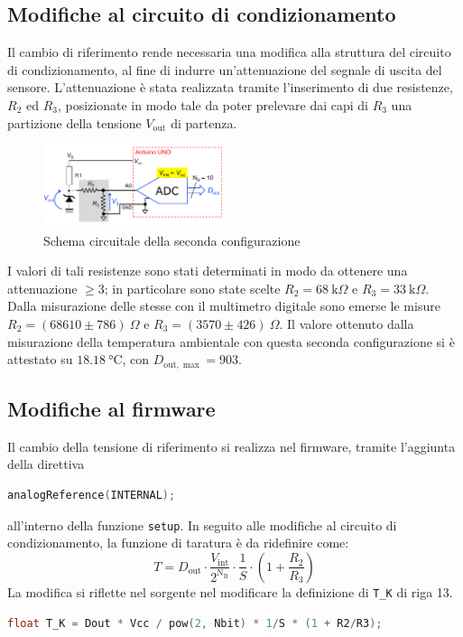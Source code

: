 \documentclass{article}
\begin{document}
\subsection{Modifiche al circuito di condizionamento}
Il cambio di riferimento rende necessaria una modifica alla struttura del circuito di condizionamento, al fine di indurre un'attenuazione del segnale di uscita del sensore. L'attenuazione è stata realizzata tramite l'inserimento di due resistenze, 
$R_2$ ed $R_3$, posizionate in modo tale da poter prelevare dai capi di $R_3$ una partizione della tensione $V_\text{out}$ di partenza.
\begin{figure}[H]
    \centering\includegraphics[width=200px]{img/circuito_2.png}
    \caption{Schema circuitale della seconda configurazione}
\end{figure}
I valori di tali resistenze sono stati determinati in modo da ottenere una attenuazione $\ge 3$; in particolare sono state scelte 
$R_2 = \SI{68}{\kilo\Omega}$ e $R_3=\SI{33}{\kilo\Omega}$. Dalla misurazione delle stesse con il multimetro digitale sono emerse le misure $R_2=\left(68610\pm786\right)\SI{}{\Omega}$ e $R_3=\left(3570\pm426\right)\SI{}{\Omega}$.
Il valore ottenuto dalla misurazione della temperatura ambientale con questa seconda configurazione si è attestato su $\SI{18.18}{\celsius}$, con $D_{\text{out}, \max} = 903$.
\subsection{Modifiche al firmware}
Il cambio della tensione di riferimento si realizza nel firmware, tramite l'aggiunta della direttiva

\lstset{style=mystyle}

\begin{lstlisting}[language=C]
    analogReference(INTERNAL); 
\end{lstlisting}    
all'interno della funzione \texttt{setup}.
In seguito alle modifiche al circuito di condizionamento, la funzione di taratura è da ridefinire come:
\begin{equation*}
    T=D_{\text{out}}\cdot\frac{V_{\text{int}}}{2^{\text{N}_\text{B}}}\cdot\frac{1}{S}\cdot\left(1+\frac{R_2}{R_3}\right)
\end{equation*}
La modifica si riflette nel sorgente nel modificare la definizione di \texttt{T\_K} di riga 13.
\begin{lstlisting}[language=C]
    float T_K = Dout * Vcc / pow(2, Nbit) * 1/S * (1 + R2/R3);
\end{lstlisting}    
\end{document}
